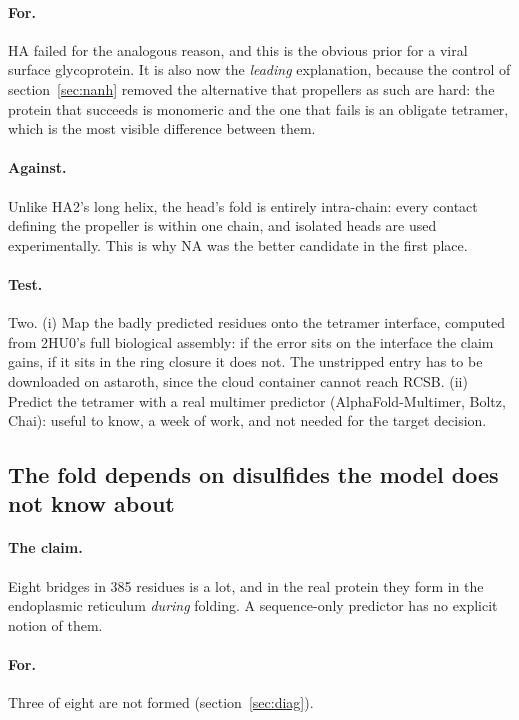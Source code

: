 \documentclass[11pt,a4paper]{article}
\begin{document}
\paragraph{For.} HA failed for the analogous reason, and this is the obvious
prior for a viral surface glycoprotein. It is also now the \emph{leading}
explanation, because the control of section~\ref{sec:nanh} removed the
alternative that propellers as such are hard: the protein that succeeds is
monomeric and the one that fails is an obligate tetramer, which is the most
visible difference between them.

\paragraph{Against.} Unlike HA2's long helix, the head's fold is entirely
intra-chain: every contact defining the propeller is within one chain, and
isolated heads are used experimentally. This is why NA was the better candidate
in the first place.

\paragraph{Test.} Two. (i) Map the badly predicted residues onto the tetramer
interface, computed from 2HU0's full biological assembly: if the error sits on
the interface the claim gains, if it sits in the ring closure it does not. The
unstripped entry has to be downloaded on astaroth, since the cloud container
cannot reach RCSB. (ii) Predict the tetramer with a real multimer predictor
(AlphaFold-Multimer, Boltz, Chai): useful to know, a week of work, and not needed
for the target decision.

\subsection{The fold depends on disulfides the model does not know about}

\paragraph{The claim.} Eight bridges in 385 residues is a lot, and in the real
protein they form in the endoplasmic reticulum \emph{during} folding. A
sequence-only predictor has no explicit notion of them.

\paragraph{For.} Three of eight are not formed (section~\ref{sec:diag}).
\end{document}
